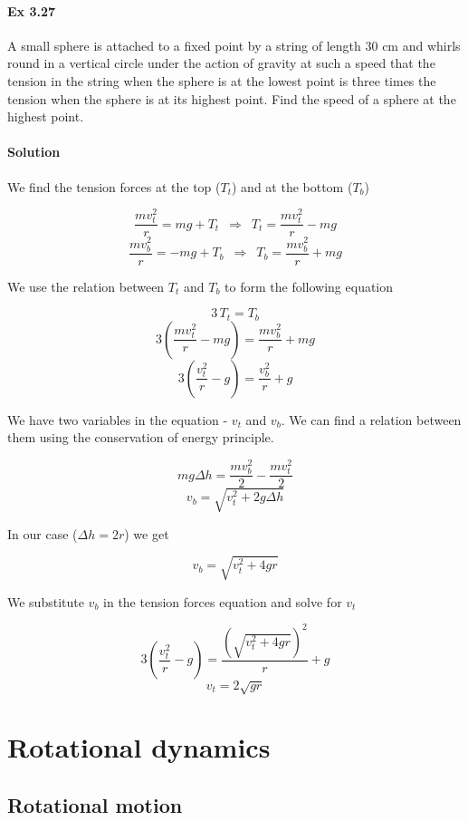 \documentclass{article}
\begin{document}

\paragraph{Ex 3.27}
A small sphere is attached to a fixed point by a string of length 30 cm and whirls round in a vertical circle under the action of gravity at such a speed that the tension in the string when the sphere is at the lowest point is three times the tension when the sphere is at its highest point. Find the speed of a sphere at the highest point.
\paragraph{Solution}

We find the tension forces at the top ($T_t$) and at the bottom ($T_b$)

\[ \frac{mv_t^2}{r} = mg + T_t \,\,\, \Rightarrow \,\,\, T_t = \frac{mv_t^2}{r} - mg \]
\[ \frac{mv_b^2}{r} = -mg + T_b \,\,\, \Rightarrow \,\,\, T_b = \frac{mv_b^2}{r} + mg \]

We use the relation between $T_t$ and $T_b$ to form the following equation

\[ 3 \, T_t = T_b \]
\[ 3 \left( \frac{mv_t^2}{r} - mg \right) = \frac{mv_b^2}{r} + mg \]
\[ 3 \left( \frac{v_t^2}{r} - g \right) = \frac{v_b^2}{r} + g \]

We have two variables in the equation - $v_t$ and $v_b$. We can find a relation between them using the conservation of energy principle.

\[ mg \Delta h = \frac{mv_b^2}{2} - \frac{mv_t^2}{2} \]
\[ v_b = \sqrt{v_t^2 + 2g \Delta h} \]

In our case ($\Delta h = 2r$) we get

\[ v_b = \sqrt{v_t^2 + 4gr} \]

We substitute $v_b$ in the tension forces equation and solve for $v_t$

\[ 3 \left( \frac{v_t^2}{r} - g \right) = \frac{\left( \sqrt{v_t^2 + 4gr} \right)^2}{r} + g \]
\[ v_t = 2 \sqrt{gr} \]


\section{Rotational dynamics}
\subsection{Rotational motion}
\end{document}
